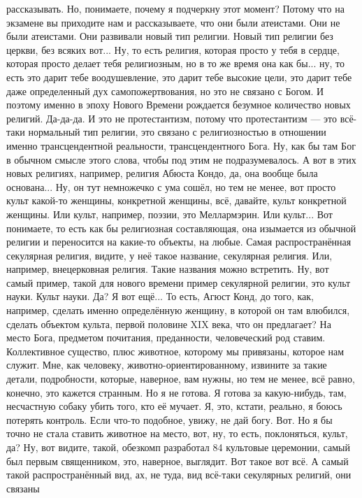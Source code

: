 рассказывать. Но, понимаете, почему я подчеркну этот момент? Потому что на
экзамене вы приходите нам и рассказываете, что они были атеистами. Они не были
атеистами. Они развивали новый тип религии. Новый тип религии без церкви, без
всяких вот... Ну, то есть религия, которая просто у тебя в сердце, которая
просто делает тебя религиозным, но в то же время она как бы... ну, то есть это
дарит тебе воодушевление, это дарит тебе высокие цели, это дарит тебе даже
определенный дух самопожертвования, но это не связано с Богом. И поэтому именно
в эпоху Нового Времени рождается безумное количество новых религий. Да-да-да. И
это не протестантизм, потому что протестантизм — это всё-таки нормальный тип
религии, это связано с религиозностью в отношении именно трансцендентной
реальности, трансцендентного Бога. Ну, как бы там Бог в обычном смысле этого
слова, чтобы под этим не подразумевалось. А вот в этих новых религиях, например,
религия Абюста Кондо, да, она вообще была основана... Ну, он тут немножечко с
ума сошёл, но тем не менее, вот просто культ какой-то женщины, конкретной
женщины, всё, давайте, культ конкретной женщины. Или культ, например, поэзии,
это Меллармэрин. Или культ... Вот понимаете, то есть как бы религиозная
составляющая, она изымается из обычной религии и переносится на какие-то
объекты, на любые. Самая распространённая секулярная религия, видите, у неё
такое название, секулярная религия. Или, например, внецерковная религия. Такие
названия можно встретить. Ну, вот самый пример, такой для нового времени пример
секулярной религии, это культ науки. Культ науки. Да? Я вот ещё... То есть,
Агюст Конд, до того, как, например, сделать именно определённую женщину, в
которой он там влюбился, сделать объектом культа, первой половине XIX века, что
он предлагает? На место Бога, предметом почитания, преданности, человеческий род
ставим. Коллективное существо, плюс животное, которому мы привязаны, которое нам
служит. Мне, как человеку, животно-ориентированному, извините за такие детали,
подробности, которые, наверное, вам нужны, но тем не менее, всё равно, конечно,
это кажется странным. Но я не готова. Я готова за какую-нибудь, там, несчастную
собаку убить того, кто её мучает. Я, это, кстати, реально, я боюсь потерять
контроль. Если что-то подобное, увижу, не дай богу. Вот. Но я бы точно не стала
ставить животное на место, вот, ну, то есть, поклоняться, культ, да? Ну, вот
видите, такой, обезкомп разработал 84 культовые церемонии, самый был первым
священником, это, наверное, выглядит. Вот такое вот всё. А самый такой
распространённый вид, ах, не туда, вид всё-таки секулярных религий, они связаны
